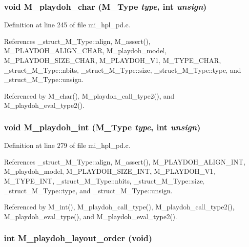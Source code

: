 \subsubsection{\setlength{\rightskip}{0pt plus 5cm}void M\_\-playdoh\_\-char (\bf{M\_\-Type} {\em type}, int {\em unsign})}\label{mi__hpl__pd_8c_9c965384c10b8b587dfa209719c99a8b}




Definition at line 245 of file mi\_\-hpl\_\-pd.c.

References \_\-struct\_\-M\_\-Type::align, M\_\-assert(), M\_\-PLAYDOH\_\-ALIGN\_\-CHAR, M\_\-playdoh\_\-model, M\_\-PLAYDOH\_\-SIZE\_\-CHAR, M\_\-PLAYDOH\_\-V1, M\_\-TYPE\_\-CHAR, \_\-struct\_\-M\_\-Type::nbits, \_\-struct\_\-M\_\-Type::size, \_\-struct\_\-M\_\-Type::type, and \_\-struct\_\-M\_\-Type::unsign.

Referenced by M\_\-char(), M\_\-playdoh\_\-call\_\-type2(), and M\_\-playdoh\_\-eval\_\-type2().
\subsubsection{\setlength{\rightskip}{0pt plus 5cm}void M\_\-playdoh\_\-int (\bf{M\_\-Type} {\em type}, int {\em unsign})}\label{mi__hpl__pd_8c_56522f078b4375f78b4e6599501fc6b1}




Definition at line 279 of file mi\_\-hpl\_\-pd.c.

References \_\-struct\_\-M\_\-Type::align, M\_\-assert(), M\_\-PLAYDOH\_\-ALIGN\_\-INT, M\_\-playdoh\_\-model, M\_\-PLAYDOH\_\-SIZE\_\-INT, M\_\-PLAYDOH\_\-V1, M\_\-TYPE\_\-INT, \_\-struct\_\-M\_\-Type::nbits, \_\-struct\_\-M\_\-Type::size, \_\-struct\_\-M\_\-Type::type, and \_\-struct\_\-M\_\-Type::unsign.

Referenced by M\_\-int(), M\_\-playdoh\_\-call\_\-type(), M\_\-playdoh\_\-call\_\-type2(), M\_\-playdoh\_\-eval\_\-type(), and M\_\-playdoh\_\-eval\_\-type2().
\subsubsection{\setlength{\rightskip}{0pt plus 5cm}int M\_\-playdoh\_\-layout\_\-order (void)}\label{mi__hpl__pd_8c_43a8d3d795e7f81df5501035b981d18d}




